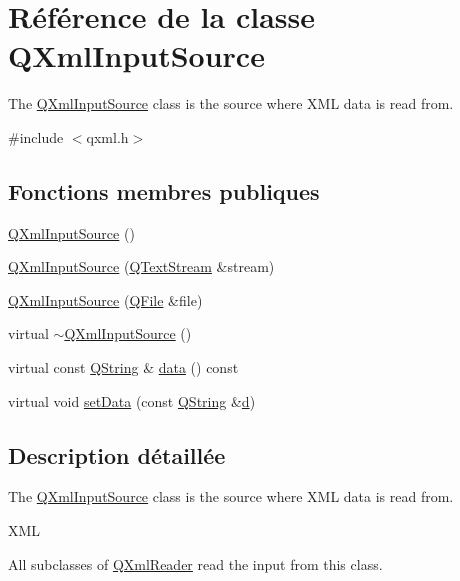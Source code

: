 \hypertarget{class_q_xml_input_source}{}\section{Référence de la classe Q\+Xml\+Input\+Source}
\label{class_q_xml_input_source}


The \hyperlink{class_q_xml_input_source}{Q\+Xml\+Input\+Source} class is the source where X\+M\+L data is read from.  




{\ttfamily \#include $<$qxml.\+h$>$}

\subsection*{Fonctions membres publiques}
\begin{DoxyCompactItemize}
\item 
\hyperlink{class_q_xml_input_source_ae01ad9dbd2e6d950fe4d43e7f7ba5e80}{Q\+Xml\+Input\+Source} ()
\item 
\hyperlink{class_q_xml_input_source_a301b2d54ab84af500ac65257de94f23d}{Q\+Xml\+Input\+Source} (\hyperlink{class_q_text_stream}{Q\+Text\+Stream} \&stream)
\item 
\hyperlink{class_q_xml_input_source_af31832f657ee461a8fbe9b9f9227c218}{Q\+Xml\+Input\+Source} (\hyperlink{class_q_file}{Q\+File} \&file)
\item 
virtual \hyperlink{class_q_xml_input_source_ac488a4e4c15218584c36c54bb4d4d78b}{$\sim$\+Q\+Xml\+Input\+Source} ()
\item 
virtual const \hyperlink{class_q_string}{Q\+String} \& \hyperlink{class_q_xml_input_source_ae450001e8b1775cd91e93e0d63d201df}{data} () const 
\item 
virtual void \hyperlink{class_q_xml_input_source_a3ecfd199af8d72d33a9ef7b919794923}{set\+Data} (const \hyperlink{class_q_string}{Q\+String} \&\hyperlink{060__command__switch_8tcl_af43f4b1f0064a33b2d662af9f06d3a00}{d})
\end{DoxyCompactItemize}


\subsection{Description détaillée}
The \hyperlink{class_q_xml_input_source}{Q\+Xml\+Input\+Source} class is the source where X\+M\+L data is read from. 

X\+M\+L

All subclasses of \hyperlink{class_q_xml_reader}{Q\+Xml\+Reader} read the input from this class. 

